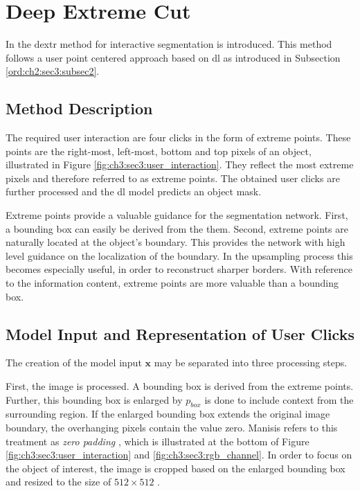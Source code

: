 
\section{Deep Extreme Cut}\label{ord:ch3:sec3}

In \cite{Man18-DEXTR} the \gls{dextr} method for interactive segmentation is introduced.
This method follows a user point centered approach based on \gls{dl} as introduced in Subsection \ref{ord:ch2:sec3:subsec2}.

\subsection{Method Description}\label{ord:ch3:sec3:subsec1}

The required user interaction are four clicks in the form of extreme points.
These points are the right-most, left-most, bottom and top pixels of an object,  illustrated in Figure \ref{fig:ch3:sec3:user_interaction}.
They reflect the most extreme pixels and therefore referred to as extreme points.
The obtained user clicks are further processed and the \gls{dl} model predicts an object mask.

Extreme points provide a valuable guidance for the segmentation network.
First, a bounding box can easily be derived from the them.
Second, extreme points are naturally located at the object's boundary.
This provides the network with high level guidance on the localization of the boundary.
In the upsampling process this becomes especially useful, in order to reconstruct sharper borders.
With reference to the information content, extreme points are more valuable than a bounding box.

\subsection{Model Input and Representation of User Clicks}\label{ord:ch3:sec3:subsec2}

The creation of the model input $\textbf{x}$ may be separated into three processing steps.

First, the image is processed. 
A bounding box is derived from the extreme points. 
Further, this bounding box is enlarged by $p_{{box}}$  is done to include context from the surrounding region.
If the enlarged bounding box extends the original image boundary, the overhanging pixels contain the value zero.
Manisis \etal refers to this treatment as \textit{zero padding} \cite{Man18-DEXTR}, which is illustrated at the bottom of Figure \ref{fig:ch3:sec3:user_interaction} and \ref{fig:ch3:sec3:rgb_channel}.
In order to focus on the object of interest, the image is cropped based on the enlarged bounding box and resized to the size of $512 \times 512$ .

